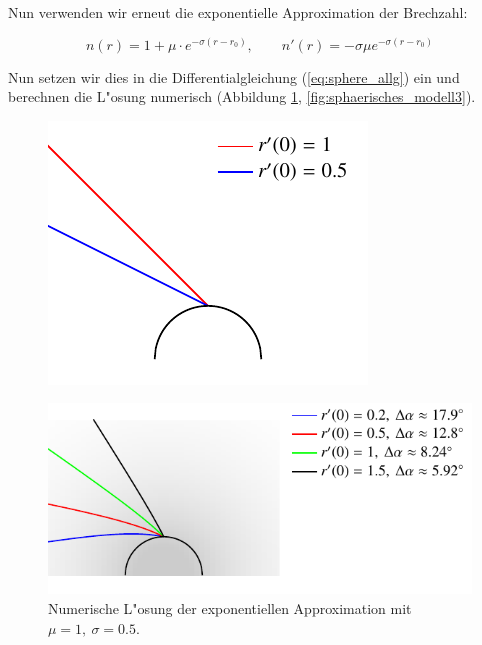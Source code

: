 \begin{refsection}
Nun verwenden wir erneut die exponentielle Approximation der Brechzahl: 

$$n(r) = 1 + \mu \cdot e^{-\sigma (r - r_0)}, \qquad n'(r) = -\sigma \mu e^{-\sigma (r - r_0)}$$

Nun setzen wir dies in die Differentialgleichung (\ref{eq:sphere_allg}) ein und berechnen die L"osung numerisch (Abbildung \ref{fig:sphaerisches_modell2}, \ref{fig:sphaerisches_modell3}). 

\begin{figure}
\centering
\includegraphics[scale=1]{licht/standalone/fig_sphere_simulation_vacuum.pdf}
\end{figure}

\begin{figure}
\centering
\includegraphics[scale=1]{licht/standalone/fig_sphere_simulation1.pdf}
\caption{Numerische L"osung der exponentiellen Approximation mit $\mu = 1, \: \sigma = 0.5$. 
\label{fig:sphaerisches_modell2}}
\end{figure}


\end{refsection}
